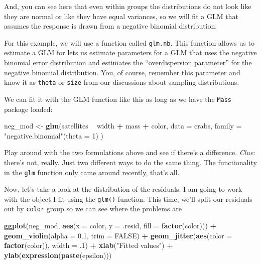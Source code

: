 \documentclass[
]{book}
\newenvironment{Shaded}{\begin{snugshade}}{\end{snugshade}}
\newcommand{\DataTypeTok}[1]{\textcolor[rgb]{0.13,0.29,0.53}{#1}}
\newcommand{\DecValTok}[1]{\textcolor[rgb]{0.00,0.00,0.81}{#1}}
\newcommand{\FloatTok}[1]{\textcolor[rgb]{0.00,0.00,0.81}{#1}}
\newcommand{\KeywordTok}[1]{\textcolor[rgb]{0.13,0.29,0.53}{\textbf{#1}}}
\newcommand{\NormalTok}[1]{#1}
\newcommand{\OperatorTok}[1]{\textcolor[rgb]{0.81,0.36,0.00}{\textbf{#1}}}
\newcommand{\OtherTok}[1]{\textcolor[rgb]{0.56,0.35,0.01}{#1}}
\newcommand{\StringTok}[1]{\textcolor[rgb]{0.31,0.60,0.02}{#1}}
\begin{document}
And, you can see here that even within groups the distributions do not look like they are normal or like they have equal variances, so we will fit a GLM that assumes the response is drawn from a negative binomial distribution.

For this example, we will use a function called \texttt{glm.nb}. This function allows us to estimate a GLM for lets us estimate parameters for a GLM that uses the negative binomial error distribution and estimates the ``overdispersion parameter'' for the negative binomial distribution. You, of course, remember this parameter and know it as \texttt{theta} or \texttt{size} from our discussions about sampling distributions.

We can fit it with the GLM function like this as long as we have the \texttt{Mass} package loaded:

\begin{Shaded}
\begin{Highlighting}[]
\NormalTok{neg_mod <-}\StringTok{ }\KeywordTok{glm}\NormalTok{(satellites }\OperatorTok{~}\StringTok{ }\NormalTok{width }\OperatorTok{+}\StringTok{ }\NormalTok{mass }\OperatorTok{+}\StringTok{ }\NormalTok{color,}
  \DataTypeTok{data =}\NormalTok{ crabs,}
  \DataTypeTok{family =} \StringTok{"negative.binomial"}\NormalTok{(}\DataTypeTok{theta =} \DecValTok{1}\NormalTok{)}
\NormalTok{)}
\end{Highlighting}
\end{Shaded}

Play around with the two formulations above and see if there's a difference. \emph{Clue}: there's not, really. Just two different ways to do the same thing. The functionality in the \texttt{glm} function only came around recently, that's all.

Now, let's take a look at the distribution of the residuals. I am going to work with the object I fit using the \texttt{glm()} function. This time, we'll split our residuals out by \texttt{color} group so we can see where the problems are

\begin{Shaded}
\begin{Highlighting}[]
\KeywordTok{ggplot}\NormalTok{(neg_mod, }\KeywordTok{aes}\NormalTok{(}\DataTypeTok{x =}\NormalTok{ color, }\DataTypeTok{y =}\NormalTok{ .resid, }\DataTypeTok{fill =} \KeywordTok{factor}\NormalTok{(color))) }\OperatorTok{+}
\StringTok{  }\KeywordTok{geom_violin}\NormalTok{(}\DataTypeTok{alpha =} \FloatTok{0.1}\NormalTok{, }\DataTypeTok{trim =} \OtherTok{FALSE}\NormalTok{) }\OperatorTok{+}
\StringTok{  }\KeywordTok{geom_jitter}\NormalTok{(}\KeywordTok{aes}\NormalTok{(}\DataTypeTok{color =} \KeywordTok{factor}\NormalTok{(color)), }\DataTypeTok{width =} \FloatTok{.1}\NormalTok{) }\OperatorTok{+}
\StringTok{  }\KeywordTok{xlab}\NormalTok{(}\StringTok{"Fitted values"}\NormalTok{) }\OperatorTok{+}
\StringTok{  }\KeywordTok{ylab}\NormalTok{(}\KeywordTok{expression}\NormalTok{(}\KeywordTok{paste}\NormalTok{(epsilon)))}
\end{Highlighting}
\end{Shaded}
\end{document}
